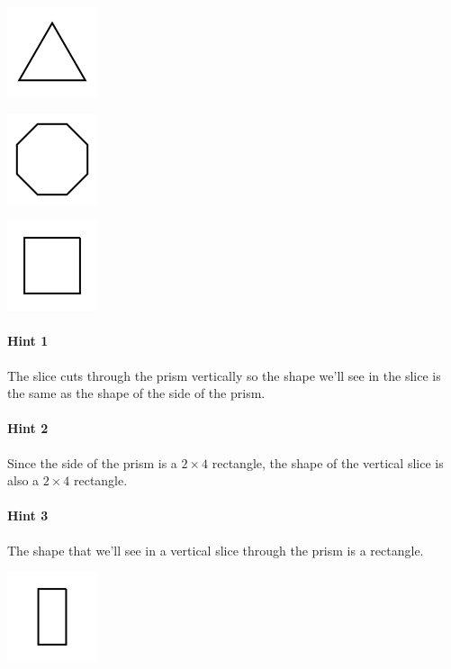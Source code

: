 \documentclass[twocolumn,10pt]{article}
\def\shrinkfactor{0.55}
\begin{document}
 
\includegraphics[scale=\shrinkfactor]{figures/15c855a8a232e6c1873c5f46769050a9c13051b8.png}


\includegraphics[scale=\shrinkfactor]{figures/7d98a99c75a84da8f748444ad7a3a8053be16a27.png}


\includegraphics[scale=\shrinkfactor]{figures/4b59a0ece6acc7c19c389e1de534d1df93bf1169.png}



\paragraph{Hint 1}The slice cuts through the prism vertically so the shape we'll see in the slice is the same as the shape of the side of the prism.

\paragraph{Hint 2}Since the side of the prism is a $2 \times 4$ rectangle, the shape of the vertical slice is also a $2 \times 4$ rectangle.

\paragraph{Hint 3}The shape that we'll see in a vertical slice through the prism is a rectangle.   

\includegraphics[scale=\shrinkfactor]{figures/225bc3d058cebe2059fc56f78ef80b5f3e0f2da7.png}
\end{document}
